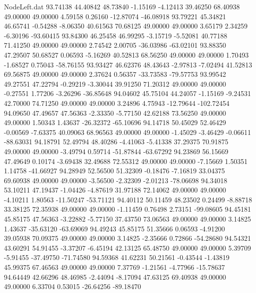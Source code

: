 \begin{filecontents}{NodeLeft.dat}
  93.74138   44.40842   48.73840    -1.15169   -4.12413   39.46250   68.40938   49.00000   49.00000    4.59158    0.26160  -12.87074  -46.08918
  93.79221   45.34821   46.65741    -0.54288   -8.06350   40.61563   70.68125   49.00000   49.00000    3.65179    2.34259   -6.30196  -93.60415
  93.84300   46.25458   46.99295    -3.15719   -5.52081   40.77188   71.41250   49.00000   49.00000    2.74542    2.00705  -36.03986  -63.02101
  93.88350   47.29507   50.68527     0.06593   -5.16269   40.52813   68.56250   49.00000   49.00000    1.70493   -1.68527    0.75043  -58.76155
  93.93427   46.62376   48.43643    -2.97813   -7.02494   41.52813   69.56875   49.00000   49.00000    2.37624    0.56357  -33.73583  -79.57753
  93.99542   49.27551   47.22794    -0.29219   -3.30044   39.91250   71.20312   49.00000   49.00000   -0.27551    1.77206   -3.26296  -36.85648
  94.04602   45.75104   44.24057    -1.15169   -9.24531   42.70000   74.71250   49.00000   49.00000    3.24896    4.75943  -12.79644 -102.72454
  94.09650   47.49657   47.56363    -2.33350   -5.77150   42.62188   73.56250   49.00000   49.00000    1.50343    1.43637  -26.32372  -65.10696
  94.14718   50.45029   52.46429    -0.00569   -7.63375   40.09063   68.96563   49.00000   49.00000   -1.45029   -3.46429   -0.06611  -88.63031
  94.18791   52.49794   48.40286    -4.41063   -5.41338   37.29375   70.91875   49.00000   49.00000   -3.49794    0.59714  -51.87844  -63.67292
  94.23869   56.15669   47.49649     0.10174   -3.69438   32.49688   72.55312   49.00000   49.00000   -7.15669    1.50351    1.14758  -41.66927
  94.28949   52.56500   51.32309    -0.18476   -7.16819   33.04375   69.60938   49.00000   49.00000   -3.56500   -2.32309   -2.01213  -78.06698
  94.34018   53.10211   47.19437    -1.04426   -4.87619   31.97188   72.14062   49.00000   49.00000   -4.10211    1.80563  -11.50247  -53.71121
  94.40112   50.11459   48.23502     0.24499   -8.88718   33.38125   72.35938   49.00000   49.00000   -1.11459    0.76498    2.73151  -99.08605
  94.45181   45.85175   47.56363    -3.22882   -5.77150   37.43750   73.06563   49.00000   49.00000    3.14825    1.43637  -35.63120  -63.69069
  94.49243   45.85175   51.35666     0.06593   -4.91200   39.05938   70.09375   49.00000   49.00000    3.14825   -2.35666    0.72866  -54.28680
  94.54321   43.60291   54.91455    -3.37207   -6.45194   42.13125   65.48750   49.00000   49.00000    5.39709   -5.91455  -37.49750  -71.74580
  94.59368   41.62231   50.21561    -0.43544   -1.43819   45.99375   67.46563   49.00000   49.00000    7.37769   -1.21561   -4.77966  -15.78637
  94.64449   42.66296   48.46985    -2.44094   -8.17094   47.63125   69.40938   49.00000   49.00000    6.33704    0.53015  -26.64256  -89.18470

\end{filecontents}
